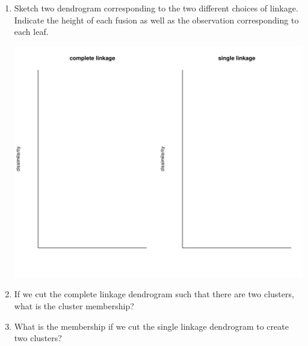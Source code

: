 \documentclass{article}\usepackage[]{graphicx}\usepackage[]{color}
\makeatletter
\def\maxwidth{ %
  \ifdim\Gin@nat@width>\linewidth
    \linewidth
  \else
    \Gin@nat@width
  \fi
}
\newenvironment{knitrout}{}{} %
\makeatother
\begin{document}
\begin{enumerate}
\item Sketch two dendrogram corresponding to the two different choices of linkage. Indicate the height of each fusion as well as the observation corresponding to each leaf.

\begin{knitrout}
\color{fgcolor}
\includegraphics[width=\maxwidth]{figure/unnamed-chunk-1-1} 

\end{knitrout}


\item If we cut the complete linkage dendrogram such that there are two clusters, what is the cluster membership?
\vspace{15mm}
\item What is the membership if we cut the single linkage dendrogram to create two clusters?
\end{enumerate}
\end{document}
